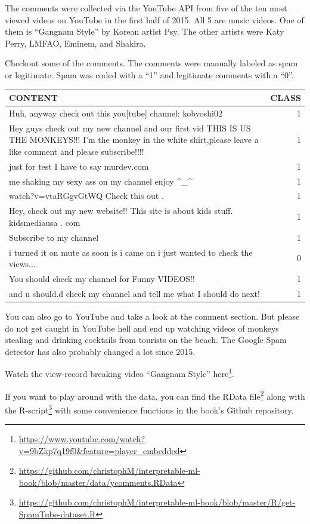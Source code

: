 \documentclass[12pt,]{krantz}
\renewcommand{\href}[2]{#2\footnote{\url{#1}}}
\begin{document}
The comments were collected via the YouTube API from five of the ten
most viewed videos on YouTube in the first half of 2015. All 5 are music
videos. One of them is ``Gangnam Style'' by Korean artist Psy. The other
artists were Katy Perry, LMFAO, Eminem, and Shakira.

Checkout some of the comments. The comments were manually labeled as
spam or legitimate. Spam was coded with a ``1'' and legitimate comments
with a ``0''.

\begin{tabular}{>{\raggedright\arraybackslash}p{10cm}|r}
\hline
CONTENT & CLASS\\
\hline
Huh, anyway check out this you[tube] channel: kobyoshi02 & 1\\
\hline
Hey guys check out my new channel and our first vid THIS IS US THE  MONKEYS!!! I'm the monkey in the white shirt,please leave a like comment  and please subscribe!!!! & 1\\
\hline
just for test I have to say murdev.com & 1\\
\hline
me shaking my sexy ass on my channel enjoy \textasciicircum{}\_\textasciicircum{} & 1\\
\hline
watch?v=vtaRGgvGtWQ   Check this out . & 1\\
\hline
Hey, check out my new website!! This site is about kids stuff. kidsmediausa  . com & 1\\
\hline
Subscribe to my channel & 1\\
\hline
i turned it on mute as soon is i came on i just wanted to check the  views... & 0\\
\hline
You should check my channel for Funny VIDEOS!! & 1\\
\hline
and u should.d check my channel and tell me what I should do next! & 1\\
\hline
\end{tabular}

You can also go to YouTube and take a look at the comment section. But
please do not get caught in YouTube hell and end up watching videos of
monkeys stealing and drinking cocktails from tourists on the beach. The
Google Spam detector has also probably changed a lot since 2015.

\href{https://www.youtube.com/watch?v=9bZkp7q19f0\&feature=player_embedded}{Watch
the view-record breaking video ``Gangnam Style'' here}.

If you want to play around with the data, you can find the
\href{https://github.com/christophM/interpretable-ml-book/blob/master/data/ycomments.RData}{RData
file} along with the
\href{https://github.com/christophM/interpretable-ml-book/blob/master/R/get-SpamTube-dataset.R}{R-script}
with some convenience functions in the book's Github repository.
\end{document}
